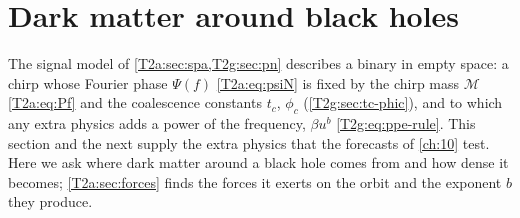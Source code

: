\providecommand{\TwrhoOrb}{}\renewcommand{\TwrhoOrb}{2.279\times10^{16}}
\providecommand{\TwrhoBoost}{}\renewcommand{\TwrhoBoost}{2.279\times10^{18}}
\providecommand{\TwmuParticle}{}\renewcommand{\TwmuParticle}{2.003\times10^{-12}}
\providecommand{\TwmuCompton}{}\renewcommand{\TwmuCompton}{6.681\times10^{-15}}
\providecommand{\TwfeqA}{}\renewcommand{\TwfeqA}{4.181}
\providecommand{\TwdPhiFourA}{}\renewcommand{\TwdPhiFourA}{1.302\times10^{5}}
\providecommand{\TwbexpA}{}\renewcommand{\TwbexpA}{-4.333}
\providecommand{\TwfeqB}{}\renewcommand{\TwfeqB}{8.883}
\providecommand{\TwdPhiFourB}{}\renewcommand{\TwdPhiFourB}{1.325\times10^{6}}
\providecommand{\TwbexpB}{}\renewcommand{\TwbexpB}{-4}
\providecommand{\TwfeqC}{}\renewcommand{\TwfeqC}{16.75}
\providecommand{\TwdPhiFourC}{}\renewcommand{\TwdPhiFourC}{5.191\times10^{6}}
\providecommand{\TwbexpC}{}\renewcommand{\TwbexpC}{-3.778}
\providecommand{\TwclosedVsNum}{}\renewcommand{\TwclosedVsNum}{1.343\times10^{-13}}
\providecommand{\TwPLerrFour}{}\renewcommand{\TwPLerrFour}{35.35}
\providecommand{\TwfeqD}{}\renewcommand{\TwfeqD}{24.26}
\providecommand{\TwdPhiFourD}{}\renewcommand{\TwdPhiFourD}{8.937\times10^{6}}
\providecommand{\TwbexpD}{}\renewcommand{\TwbexpD}{-3.667}
\providecommand{\TwCwSmallErr}{}\renewcommand{\TwCwSmallErr}{0.8254}
\providecommand{\TwaccRatioThirty}{}\renewcommand{\TwaccRatioThirty}{0.02222}
\providecommand{\TwaccRatioThree}{}\renewcommand{\TwaccRatioThree}{0.2222}
\providecommand{\TwffourImri}{}\renewcommand{\TwffourImri}{21.7}
\providecommand{\TwlnLambdaC}{}\renewcommand{\TwlnLambdaC}{3.286}
 
\section{Dark matter around black holes}
\label{T2a:sec:dm}

The signal model of \cref{T2a:sec:spa,T2g:sec:pn} describes a binary in empty space: a chirp whose Fourier phase $\Psi(f)$ \eqref{T2a:eq:psiN} is fixed by the chirp mass $\mathcal M$ \eqref{T2a:eq:Pf} and the coalescence constants $t_c$, $\phi_c$ (\cref{T2g:sec:tc-phic}), and to which any extra physics adds a power of the frequency, $\beta u^b$ \eqref{T2g:eq:ppe-rule}. This section and the next supply the extra physics that the forecasts of \cref{ch:10} test. Here we ask where dark matter around a black hole comes from and how dense it becomes; \cref{T2a:sec:forces} finds the forces it exerts on the orbit and the exponent $b$ they produce.

